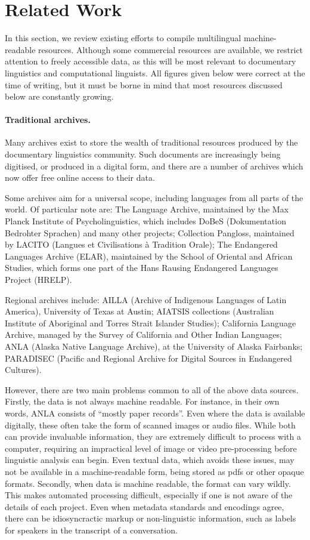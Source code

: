 \section{Related Work} \label{sec:related}

In this section, we review existing efforts to compile multilingual machine-readable resources.  Although some commercial resources are available, we restrict attention to freely accessible data, as this will be most relevant to documentary linguistics and computational linguists.  All figures given below were correct at the time of writing, but it must be borne in mind that most resources discussed below are constantly growing.

\paragraph{Traditional archives.}
Many archives exist to store the wealth of traditional resources produced by the documentary linguistics community.  Such documents are increasingly being digitised, or produced in a digital form, and there are a number of archives which now offer free online access to their data.

Some archives aim for a universal scope, including languages from all parts of the world.  Of particular note are: The Language Archive, maintained by the Max Planck Institute of Psycholinguistics, which includes DoBeS (Dokumentation Bedrohter Sprachen) and many other projects;
Collection Pangloss, maintained by LACITO (Langues et Civilisations à Tradition Orale);
The Endangered Languages Archive (ELAR), maintained by the School of Oriental and African Studies, which forms one part of the Hans Rausing Endangered Languages Project (HRELP).

Regional archives include: AILLA (Archive of Indigenous Languages of Latin America), University of Texas at Austin;
AIATSIS collections (Australian Institute of Aboriginal and Torres Strait Islander Studies);
California Language Archive, managed by the Survey of California and Other Indian Languages;
ANLA (Alaska Native Language Archive), at the University of Alaska Fairbanks;
PARADISEC (Pacific and Regional Archive for Digital Sources in Endangered Cultures).

However, there are two main problems common to all of the above data sources.  Firstly, the data is not always machine readable.  For instance, in their own words, ANLA consists of ``mostly paper records''.  Even where the data is available digitally, these often take the form of scanned images or audio files.  While both can provide invaluable information, they are extremely difficult to process with a computer, requiring an impractical level of image or video pre-processing before linguistic analysis can begin.  Even textual data, which avoids these issues, may not be available in a machine-readable form, being stored as pdfs or other opaque formats.
Secondly, when data is machine readable, the format can vary wildly.  This makes automated processing difficult, especially if one is not aware of the details of each project.  Even when metadata standards and encodings agree, there can be idiosyncractic markup or non-linguistic information, such as labels for speakers in the transcript of a conversation.

